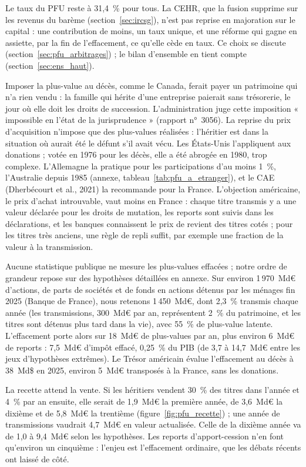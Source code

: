 \documentclass[11pt,a4paper]{article}
\begin{document}
Le taux du PFU reste à 31,4~\% pour tous. La CEHR, que la fusion supprime sur les revenus du barème
(section~\ref{sec:ircsg}), n'est pas reprise en majoration sur le capital : une contribution de moins, un taux
unique, et une réforme qui gagne en assiette, par la fin de l'effacement, ce qu'elle cède en taux. Ce choix se
discute (section~\ref{sec:pfu_arbitrages}) ; le bilan d'ensemble en tient compte (section~\ref{sec:ens_haut}).

Imposer la plus-value au décès, comme le Canada, ferait payer un patrimoine qui n'a rien vendu : la famille qui
hérite d'une entreprise paierait sans trésorerie, le jour où elle doit les droits de succession. L'administration
juge cette imposition « impossible en l'état de la jurisprudence » (rapport n°~3056). La reprise du prix
d'acquisition n'impose que des plus-values réalisées : l'héritier est dans la situation où aurait été le défunt s'il
avait vécu. Les États-Unis l'appliquent aux donations ; votée en 1976 pour les décès, elle a été abrogée en 1980,
trop complexe. L'Allemagne la pratique pour les participations d'au moins 1~\%, l'Australie depuis 1985
(annexe, tableau~\ref{tab:pfu_a_etranger}), et le CAE (Dherbécourt et al., 2021) la recommande pour la France. L'objection
américaine, le prix d'achat introuvable, vaut moins en France : chaque titre transmis y a une valeur déclarée pour
les droits de mutation, les reports sont suivis dans les déclarations, et les banques connaissent le prix de revient
des titres cotés ; pour les titres très anciens, une règle de repli suffit, par exemple une fraction de la valeur à
la transmission.

Aucune statistique publique ne mesure les plus-values effacées ; notre ordre de grandeur repose sur des hypothèses
détaillées en annexe. Sur environ 1\,970~Md€ d'actions, de parts de sociétés et de fonds en actions détenus par les
ménages fin 2025 (Banque de France), nous retenons 1\,450~Md€, dont 2,3~\% transmis chaque année (les transmissions,
300~Md€ par an, représentent 2~\% du patrimoine, et les titres sont détenus plus tard dans la vie), avec 55~\% de
plus-value latente. L'effacement porte alors sur 18~Md€ de plus-values par an, plus environ 6~Md€ de reports :
7,5~Md€ d'impôt effacé, 0,25~\% du PIB (de 3,7 à 14,7~Md€ entre les jeux d'hypothèses extrêmes). Le Trésor américain
évalue l'effacement au décès à 38~Md\$ en 2025, environ 5~Md€ transposés à la France, sans les donations.

La recette attend la vente. Si les héritiers vendent 30~\% des titres dans l'année et 4~\% par an ensuite, elle
serait de 1,9~Md€ la première année, de 3,6~Md€ la dixième et de 5,8~Md€ la trentième
(figure~\ref{fig:pfu_recette}) ; une année de transmissions vaudrait 4,7~Md€ en valeur actualisée. Celle de la dixième
année va de 1,0 à 9,4~Md€ selon les hypothèses. Les reports d'apport-cession n'en font qu'environ un
cinquième : l'enjeu est l'effacement ordinaire, que les débats récents ont laissé de côté.
\end{document}
